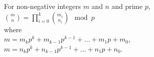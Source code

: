 \normalsize
For non-negative integers $m$ and $n$ and prime $p$,\\
${m \choose n} = \prod_{i = 0}^{k}{m_i \choose n_i} \mod p$ \\
where \\
$m = m_{k}p^{k} + m_{k - 1}p^{k - 1} + \ldots + m_{1}p + m_{0}$, \\
$m = n_{k}p^{k} + n_{k - 1}p^{k - 1} + \ldots + n_{1}p + n_{0}$.
